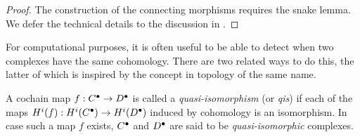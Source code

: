 \begin{proof}
  The construction of the connecting morphisms requires the snake lemma.
  We defer the technical details to the discussion in
  \cite[Section~1.3]{weibel}.
\end{proof}

For computational purposes, it is often useful to be able to detect
when two complexes have the same cohomology.
There are two related ways to do this, the latter of which is
inspired by the concept in topology of the same name.

\begin{definition}
  A cochain map $f: {{C}}^{\bullet} \to {{D}}^{\bullet}$ is called a
  \emph{quasi-isomorphism} (or \emph{qis}) if each of the maps
  $H^i(f): H^i({{C}}^{\bullet}) \to H^i({{D}}^{\bullet})$ induced by
  cohomology is an isomorphism.
  In case such a map $f$ exists, ${{C}}^{\bullet}$ and
  ${{D}}^{\bullet}$ are said to be \emph{quasi-isomorphic} complexes.
\end{definition}


